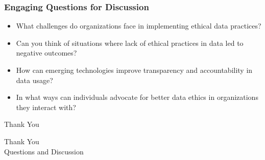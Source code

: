 \documentclass[aspectratio=169]{beamer}
\begin{document}
\begin{frame}[fragile]
    \frametitle{Engaging Questions for Discussion}
    \begin{itemize}
        \item What challenges do organizations face in implementing ethical data practices?
        \item Can you think of situations where lack of ethical practices in data led to negative outcomes?
        \item How can emerging technologies improve transparency and accountability in data usage?
        \item In what ways can individuals advocate for better data ethics in organizations they interact with?
    \end{itemize}
\end{frame}

\begin{frame}[fragile]{Thank You}
    \begin{center}
        {\Large Thank You}\\[1.em]
        {\large Questions and Discussion}
    \end{center}
\end{frame}
\end{document}
